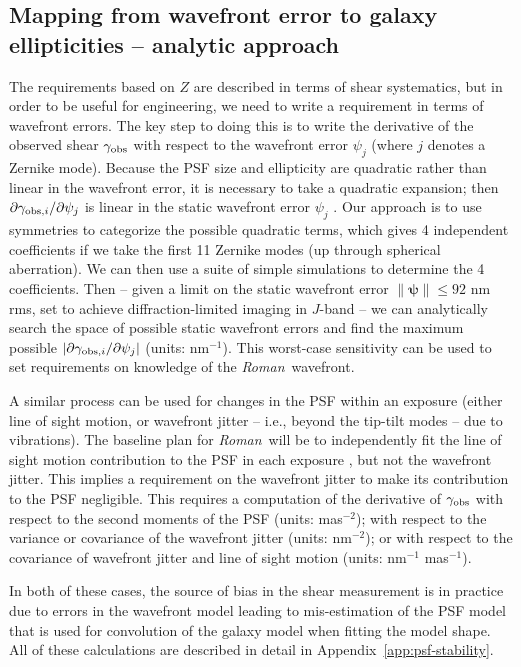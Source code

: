 \documentclass[usenatbib]{mnras}
\newcommand{\wfirst}{{\slshape Roman}}
\begin{document}
\subsection{Mapping from wavefront error to galaxy ellipticities -- analytic approach}
\label{ss:dedZ}

The requirements based on $Z$ are described in terms of shear systematics, but in order to be useful for engineering, we need to write a requirement in terms of wavefront errors. The key step to doing this is to write the derivative of the observed shear $\gamma_{\rm obs}$ with respect to the wavefront error $\psi_j$ (where $j$ denotes a Zernike mode). Because the PSF size and ellipticity are quadratic rather than linear in the wavefront error, it is necessary to take a quadratic expansion; then $\partial\gamma_{{\rm obs},i}/\partial\psi_j$ is linear in the static wavefront error $\psi_j$ \citep{2010SPIE.7731E..1EN}. Our approach is to use symmetries to categorize the possible quadratic terms, which gives 4 independent coefficients if we take the first 11 Zernike modes (up through spherical aberration). We can then use a suite of simple simulations to determine the 4 coefficients. Then -- given a limit on the static wavefront error $\lVert{\boldsymbol\psi}\rVert \le 92$ nm rms, set to achieve diffraction-limited imaging in $J$-band -- we can analytically search the space of possible static wavefront errors and find the maximum possible $|\partial\gamma_{{\rm obs},i}/\partial\psi_j|$ (units: nm$^{-1}$). This worst-case sensitivity can be used to set requirements on knowledge of the \wfirst\ wavefront.

A similar process can be used for changes in the PSF within an exposure (either line of sight motion, or wavefront jitter -- i.e., beyond the tip-tilt modes -- due to vibrations). The baseline plan for \wfirst\ will be to independently fit the line of sight motion contribution to the PSF in each exposure \citep{2012SPIE.8442E..10J}, but not the wavefront jitter. This implies a requirement on the wavefront jitter to make its contribution to the PSF negligible. This requires a computation of the derivative of $\gamma_{\rm obs}$ with respect to the second moments of the PSF (units: mas$^{-2}$); with respect to the variance or covariance of the wavefront jitter (units: nm$^{-2}$); or with respect to the covariance of wavefront jitter and line of sight motion (units: nm$^{-1}$ mas$^{-1}$).

In both of these cases, the source of bias in the shear measurement is in practice due to errors in the wavefront model leading to mis-estimation of the PSF model that is used for convolution of the galaxy model when fitting the model shape. All of these calculations are described in detail in Appendix~\ref{app:psf-stability}.
\end{document}
